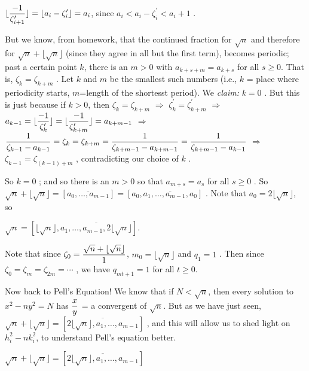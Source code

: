 $\displaystyle \lfloor{{-1}\over{\zeta_{i+1}^\prime}}\rfloor = \lfloor a_i-\zeta_i^\prime\rfloor = a_i$, since
$a_i<a_i-\zeta_i^\prime < a_i+1$ . 

\ssk

But we know, from homework, that the continued fraction for $\sqrt{n}$ and therefore 
for $\sqrt{n}+\lfloor\sqrt{n}\rfloor$ (since they agree in all but the first term), becomes
periodic; past a certain point $k$, there is an $m> 0$ with $a_{k+s+m} = a_{k+s}$ for all $s\geq 0$.
That is, $\zeta_k = \zeta_{k+m}$ .
Let $k$ and $m$ be the smallest such numbers (i.e., $k$ = place where periodicity starts, 
$m$=length of the shortesst period). We {\it claim:} $k=0$ . But this is just because if $k>0$, then
$\zeta_k = \zeta_{k+m}$ $\Rightarrow$ $\zeta_k^\prime = \zeta_{k+m}^\prime$ $\Rightarrow$
$\displaystyle a_{k-1} = \lfloor{{-1}\over{\zeta_{k}^\prime}}\rfloor = 
\lfloor{{-1}\over{\zeta_{k+m}^\prime}}\rfloor = a_{k+m-1}$ $\Rightarrow$
$\displaystyle {{1}\over{\zeta_{k-1}-a_{k-1}}} = \zeta_k =  \zeta_{k+m} = {{1}\over{\zeta_{k+m-1}-a_{k+m-1}}}
= {{1}\over{\zeta_{k+m-1}-a_{k-1}}}$ $\Rightarrow$ $\zeta_{k-1} = \zeta_{(k-1)+m}$ , contradicting
our choice of $k$ . 

\ssk

So $k=0$ ; and so there is an $m>0$ so that $a_{m+s} = a_s$ for all $s\geq 0$ . So
$\sqrt{n}+\lfloor\sqrt{n}\rfloor = [\overline{a_0,\ldots,a_{m-1}}] = [a_0,\overline{a_1,\ldots,a_{m-1},a_0}]$ .
Note that $a_0=2\lfloor\sqrt{n}\rfloor$, so 

\ssk

$\sqrt{n} = [\lfloor\sqrt{n}\rfloor,\overline{a_1,\ldots,a_{m-1},2\lfloor\sqrt{n}\rfloor}]$.

\ssk

Note that since $\displaystyle \zeta_0={{\sqrt{n}+\lfloor\sqrt{n}\rfloor}\over{1}}$, $m_0=\lfloor\sqrt{n}\rfloor$
and $q_1=1$ . Then since $\zeta_0=\zeta_m=\zeta_{2m} = \cdots$ , we have
$q_{mt+1} = 1$ for all $t\geq 0$.


\msk

Now back to Pell's Equation! We know that if $N<\sqrt{n}$, then every solution to $x^2-ny^2=N$
has $\displaystyle {{x}\over{y}}$ = a convergent of $\sqrt{n}$. But as we have just seen,
$\sqrt{n}+\lfloor\sqrt{n}\rfloor = [\overline{2\lfloor\sqrt{n}\rfloor,a_1,\ldots,a_{m-1}}]$ , and this 
will allow us to shed light on $h_i^2-nk_i^2$, to understand Pell's equation better.

$\sqrt{n}+\lfloor\sqrt{n}\rfloor = [\overline{2\lfloor\sqrt{n}\rfloor,a_1,\ldots,a_{m-1}}]$

